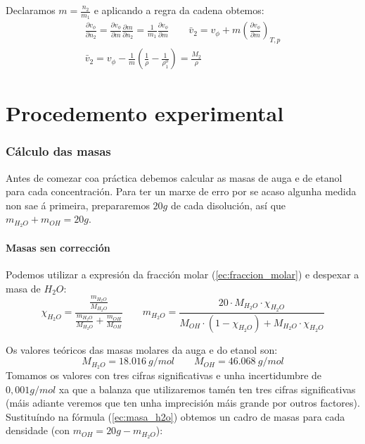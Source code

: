 \documentclass[12pt, a4paper, titlepage]{article}
\begin{document}
  Declaramos $m = \frac{n_2}{m_1}$ e aplicando a regra da cadena obtemos:
  \begin{gather}
    \frac{\partial v_\phi}{\partial n_2} = \frac{\partial v_\phi}{\partial m} \frac{\partial m}{\partial n_2} = \frac{1}{m_1} \frac{\partial v_\phi}{\partial m} \qquad \bar{v}_2 = v_\phi + m \left( \frac{\partial v_\phi}{\partial m} \right)_{T,p} \nonumber \\
    \bar{v}_2 = v_\phi - \frac{1}{m} \left( \frac{1}{\rho} - \frac{1}{\rho^0_1} \right) = \frac{M_2}{\rho} \label{ec:volume_molar_parcial}
  \end{gather}


  \newpage
  \part{Procedemento experimental}

  \section{Cálculo das masas}

  Antes de comezar coa práctica debemos calcular as masas de auga e de etanol para cada concentración. Para ter un marxe de erro por se acaso algunha medida non sae á primeira, prepararemos $20g$ de cada disolución, así que $m_{H_2O} + m_{OH} = 20g$.

  \subsection{Masas sen corrección}

  Podemos utilizar a expresión da fracción molar (\ref{ec:fraccion_molar}) e despexar a masa de $H_2O$:
  \begin{equation}
    \chi_{H_2O} = \frac{\frac{m_{H_2O}}{M_{H_2O}}}{\frac{m_{H_2O}}{M_{H_2O}} + \frac{m_{OH}}{M_{OH}}} \qquad m_{H_2O} = \frac{20 \cdot M_{H_2O} \cdot \chi_{H_2O}}{M_{OH} \cdot (1 - \chi_{H_2O}) + M_{H_2O} \cdot \chi_{H_2O}}
    \label{ec:masa_h2o}
  \end{equation}

  Os valores teóricos das masas molares da auga \cite{webqc_h2o} e do etanol \cite{webqc_oh} son:
  \begin{equation*}
    M_{H_2O} = 18.016 \ g/mol \qquad M_{OH} = 46.068 \ g/mol
  \end{equation*}
  Tomamos os valores con tres cifras significativas e unha incertidumbre de $0,001g/mol$ xa que a balanza que utilizaremos tamén ten tres cifras significativas (máis adiante veremos que ten unha imprecisión máis grande por outros factores).
  Sustituíndo na fórmula (\ref{ec:masa_h2o}) obtemos un cadro de masas para cada densidade (con $m_{OH} = 20g - m_{H_2O}$):
  
\end{document}
